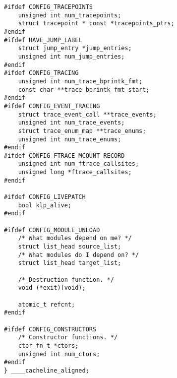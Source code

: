 \begin{lstlisting}
#ifdef CONFIG_TRACEPOINTS
	unsigned int num_tracepoints;
	struct tracepoint * const *tracepoints_ptrs;
#endif
#ifdef HAVE_JUMP_LABEL
	struct jump_entry *jump_entries;
	unsigned int num_jump_entries;
#endif
#ifdef CONFIG_TRACING
	unsigned int num_trace_bprintk_fmt;
	const char **trace_bprintk_fmt_start;
#endif
#ifdef CONFIG_EVENT_TRACING
	struct trace_event_call **trace_events;
	unsigned int num_trace_events;
	struct trace_enum_map **trace_enums;
	unsigned int num_trace_enums;
#endif
#ifdef CONFIG_FTRACE_MCOUNT_RECORD
	unsigned int num_ftrace_callsites;
	unsigned long *ftrace_callsites;
#endif

#ifdef CONFIG_LIVEPATCH
	bool klp_alive;
#endif

#ifdef CONFIG_MODULE_UNLOAD
	/* What modules depend on me? */
	struct list_head source_list;
	/* What modules do I depend on? */
	struct list_head target_list;

	/* Destruction function. */
	void (*exit)(void);

	atomic_t refcnt;
#endif

#ifdef CONFIG_CONSTRUCTORS
	/* Constructor functions. */
	ctor_fn_t *ctors;
	unsigned int num_ctors;
#endif
} ____cacheline_aligned;

\end{lstlisting}
